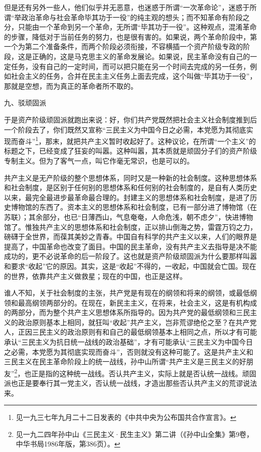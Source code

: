 \documentclass[UTF8, 12pt, a4paper]{ctexrep}
\begin{document}
但是还有另外一些人，他们似乎并无恶意，也迷惑于所谓“一次革命论”，迷惑于所谓“举政治革命与社会革命毕其功于一役”的纯主观的想头；而不知革命有阶段之分，只能由一个革命到另一个革命，无所谓“毕其功于一役”。这种观点，混淆革命的步骤，降低对于当前任务的努力，也是很有害的。如果说，两个革命阶段中，第一个为第二个准备条件，而两个阶段必须衔接，不容横插一个资产阶级专政的阶段，这是正确的，这是马克思主义的革命发展论。如果说，民主革命没有自己的一定任务，没有自己的一定时间，而可以把只能在另一个时间去完成的另一任务，例如社会主义的任务，合并在民主主义任务上面去完成，这个叫做“毕其功于一役”，那就是空想，而为真正的革命者所不取的。

九、驳顽固派

于是资产阶级顽固派就跑出来说：好，你们共产党既然把社会主义社会制度推到后一个阶段去了，你们既然又宣称“三民主义为中国今日之必需，本党愿为其彻底实现而奋斗”\footnote{见一九三七年九月二十二日发表的《中共中央为公布国共合作宣言》。}，那末，就把共产主义暂时收起好了。这种议论，在所谓“一个主义”的标题之下，已经变成了狂妄的叫嚣。这种叫嚣，其本质就是顽固分子们的资产阶级专制主义。但为了客气一点，叫它作毫无常识，也是可以的。

共产主义是无产阶级的整个思想体系，同时又是一种新的社会制度。这种思想体系和社会制度，是区别于任何别的思想体系和任何别的社会制度的，是自有人类历史以来，最完全最进步最革命最合理的。封建主义的思想体系和社会制度，是进了历史博物馆的东西了。资本主义的思想体系和社会制度，已有一部分进了博物馆（在苏联）；其余部分，也已“日薄西山，气息奄奄，人命危浅，朝不虑夕”，快进博物馆了。惟独共产主义的思想体系和社会制度，正以排山倒海之势，雷霆万钧之力，磅礴于全世界，而葆其美妙之青春。中国自有科学的共产主义以来，人们的眼界是提高了，中国革命也改变了面目。中国的民主革命，没有共产主义去指导是决不能成功的，更不必说革命的后一阶段了。这也就是资产阶级顽固派为什么要那样叫嚣和要求“收起”它的原因。其实，这是“收起”不得的，一收起，中国就会亡国。现在的世界，依靠共产主义做救星；现在的中国，也正是这样。

谁人不知，关于社会制度的主张，共产党是有现在的纲领和将来的纲领，或最低纲领和最高纲领两部分的。在现在，新民主主义，在将来，社会主义，这是有机构成的两部分，而为整个共产主义思想体系所指导的。因为共产党的最低纲领和三民主义的政治原则基本上相同，就狂叫“收起”共产主义，岂非荒谬绝伦之至？在共产党人，正因三民主义的政治原则有和自己的最低纲领基本上相同之点，所以才有可能承认“三民主义为抗日统一战线的政治基础”，才有可能承认“三民主义为中国今日之必需，本党愿为其彻底实现而奋斗”，否则就没有这种可能了。这是共产主义和三民主义在民主革命阶段上的统一战线，孙中山所谓“共产主义是三民主义的好朋友”\footnote{见一九二四年孙中山《三民主义·民生主义》第二讲（《孙中山全集》第9卷，中华书局1986年版，第386页）。}，也正是指的这种统一战线。否认共产主义，实际上就是否认统一战线。顽固派也正是要奉行其一党主义，否认统一战线，才造出那些否认共产主义的荒谬说法来。
\end{document}
